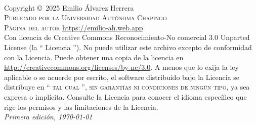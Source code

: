 
\newpage
~\vfill
\thispagestyle{empty}

\noindent Copyright \copyright\ 2025 Emilio Álvarez Herrera\\ %

\noindent \textsc{Publicado por la Universidad Autónoma Chapingo}\\ %

\noindent \textsc{Página del autor} \url{https://emilio-ah.web.app}\\ 

\noindent Con licencia de Creative Commons Reconocimiento-No comercial 3.0 Unparted License (la `` Licencia ''). No puede utilizar este archivo excepto de conformidad con la Licencia. Puede obtener una copia de la licencia en \url {http://creativecommons.org/licenses/by-nc/3.0}. A menos que lo exija la ley aplicable o se acuerde por escrito, el software distribuido bajo la Licencia se distribuye en \textsc{`` tal cual '', sin garantías ni condiciones de ningún tipo}, ya sea expresa o implícita. Consulte la Licencia para conocer el idioma específico que rige los permisos y las limitaciones de la Licencia.\\ %

\noindent \textit{Primera edición, \today} %





\pagestyle{empty} %

\tableofcontents %

\cleardoublepage %

\pagestyle{fancy} %